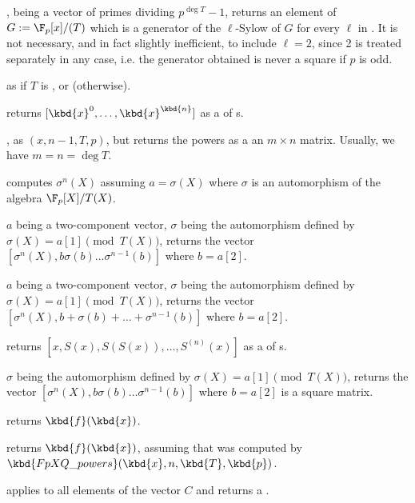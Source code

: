 ,  being a vector of
primes dividing $p^{\deg T} - 1$, returns an element of $G:=\F_p[x]/(T)$
which is a generator of the $\ell$-Sylow of $G$ for every $\ell$ in
. It is not necessary, and in fact slightly inefficient, to include
$\ell=2$, since 2 is treated separately in any case, i.e. the generator
obtained is never a square if $p$ is odd.

 as
 if $T$ is ,
or  (otherwise).


 returns $[\kbd{x}^0,
\dots, \kbd{x}^\kbd{n}]$ as a  of s.

, as
$(x, n-1, T, p)$, but returns the powers as a an
$m\times n$ matrix. Usually, we have $m = n = \deg T$.

 computes $\sigma^n(X)$
assuming $a=\sigma(X)$ where $\sigma$ is an automorphism of the algebra
$\F_p[X]/T(X)$.

$a$ being a two-component vector,
$\sigma$ being the automorphism defined by $\sigma(X)=a[1]\pmod{T(X)}$,
returns the vector $[\sigma^n(X),b\sigma(b)\ldots\sigma^{n-1}(b)]$
where $b=a[2]$.

$a$ being a two-component vector,
$\sigma$ being the automorphism defined by $\sigma(X)=a[1]\pmod{T(X)}$,
returns the vector $[\sigma^n(X),b+\sigma(b)+\ldots+\sigma^{n-1}(b)]$
where $b=a[2]$.

 returns
$[x,S(x),S(S(x)),\dots,S^{(n)}(x)]$ as a  of s.

$\sigma$ being the automorphism defined by $\sigma(X)=a[1]\pmod{T(X)}$,
returns the vector $[\sigma^n(X),b\sigma(b)\ldots\sigma^{n-1}(b)]$
where $b=a[2]$ is a square matrix.

 returns
$\kbd{f}(\kbd{x})$.

 returns
$\kbd{f}(\kbd{x})$, assuming that  was computed by
$\kbd{FpXQ\_powers}(\kbd{x}, n, \kbd{T}, \kbd{p})$.

 applies
 to all elements of the vector $C$
and returns a .

